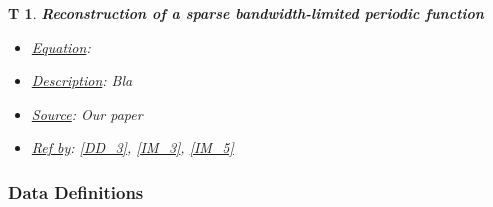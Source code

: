 \documentclass[12pt]{article}
\newtheorem{T}{T}
\begin{document}
\begin{T}
\label{T_4}
\noindent\colorbox{shadecolorT}{\normalfont \textbf{Reconstruction of a sparse bandwidth-limited periodic function}}
\normalfont
\begin{itemize}
\item \underline{Equation}: 
\item \underline{Description}: Bla
\item \underline{Source}: Our paper
\item \underline{Ref by}: \cref{DD_3}, \cref{IM_3}, \cref{IM_5}
\end{itemize}
\end{T}

\subsubsection{Data Definitions}\label{sec_datadef}

\renewcommand{\labelitemi}{$\star$}
\end{document}
